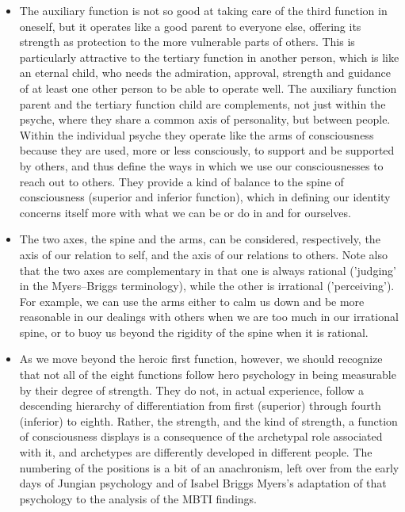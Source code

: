 \begin{itemize}
\item The auxiliary function is not so good at taking care of the third
function in oneself, but it operates like a good parent to everyone else,
offering its strength as protection to the more vulnerable parts of others.
This is particularly attractive to the tertiary function in another person,
which is like an eternal child, who needs the admiration, approval, strength
and guidance of at least one other person to be able to operate well. The
auxiliary function parent and the tertiary function child are complements, not
just within the psyche, where they share a common axis of personality, but
between people. Within the individual psyche they operate like the arms of
consciousness because they are used, more or less consciously, to support and
be supported by others, and thus define the ways in which we use our
consciousnesses to reach out to others. They provide a kind of balance to the
spine of consciousness (superior and inferior function), which in defining our
identity concerns itself more with what we can be or do in and for ourselves.

\item The two axes, the spine and the arms, can be considered, respectively,
the axis of our relation to self, and the axis of our relations to others. Note
also that the two axes are complementary in that one is always rational
('judging' in the Myers–Briggs terminology), while the other is irrational
('perceiving'). For example, we can use the arms either to calm us down and be
more reasonable in our dealings with others when we are too much in our
irrational spine, or to buoy us beyond the rigidity of the spine when it is
rational.

\item As we move beyond the heroic first function, however, we should recognize
that not all of the eight functions follow hero psychology in being measurable
by their degree of strength. They do not, in actual experience, follow a
descending hierarchy of differentiation from first (superior) through fourth
(inferior) to eighth. Rather, the strength, and the kind of strength, a
function of consciousness displays is a consequence of the archetypal role
associated with it, and archetypes are differently developed in different
people. The numbering of the positions is a bit of an anachronism, left over
from the early days of Jungian psychology and of Isabel Briggs Myers's
adaptation of that psychology to the analysis of the MBTI findings.


\end{itemize}

